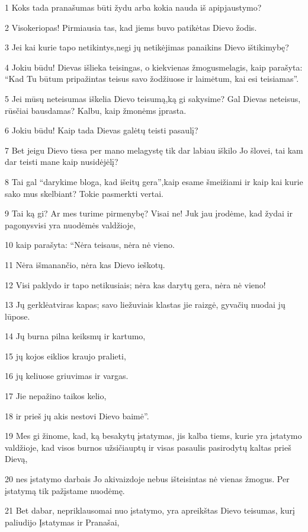 \par 1 Koks tada pranašumas būti žydu arba kokia nauda iš apipjaustymo? 
\par 2 Visokeriopas! Pirmiausia tas, kad jiems buvo patikėtas Dievo žodis. 
\par 3 Jei kai kurie tapo netikintys,­negi jų netikėjimas panaikins Dievo ištikimybę? 
\par 4 Jokiu būdu! Dievas išlieka teisingas, o kiekvienas žmogus­melagis, kaip parašyta: “Kad Tu būtum pripažintas teisus savo žodžiuose ir laimėtum, kai esi teisiamas”. 
\par 5 Jei mūsų neteisumas iškelia Dievo teisumą,­ką gi sakysime? Gal Dievas neteisus, rūsčiai bausdamas? Kalbu, kaip žmonėms įprasta. 
\par 6 Jokiu būdu! Kaip tada Dievas galėtų teisti pasaulį? 
\par 7 Bet jeigu Dievo tiesa per mano melagystę tik dar labiau iškilo Jo šlovei, tai kam dar teisti mane kaip nusidėjėlį? 
\par 8 Tai gal “darykime bloga, kad išeitų gera”,­kaip esame šmeižiami ir kaip kai kurie sako mus skelbiant? Tokie pasmerkti vertai. 
\par 9 Tai ką gi? Ar mes turime pirmenybę? Visai ne! Juk jau įrodėme, kad žydai ir pagonys­visi yra nuodėmės valdžioje, 
\par 10 kaip parašyta: “Nėra teisaus, nėra nė vieno. 
\par 11 Nėra išmanančio, nėra kas Dievo ieškotų. 
\par 12 Visi paklydo ir tapo netikusiais; nėra kas darytų gera, nėra nė vieno! 
\par 13 Jų gerklė­atviras kapas; savo liežuviais klastas jie raizgė, gyvačių nuodai jų lūpose. 
\par 14 Jų burna pilna keiksmų ir kartumo, 
\par 15 jų kojos eiklios kraujo pralieti, 
\par 16 jų keliuose griuvimas ir vargas. 
\par 17 Jie nepažino taikos kelio, 
\par 18 ir prieš jų akis nestovi Dievo baimė”. 
\par 19 Mes gi žinome, kad, ką besakytų įstatymas, jis kalba tiems, kurie yra įstatymo valdžioje, kad visos burnos užsičiauptų ir visas pasaulis pasirodytų kaltas prieš Dievą, 
\par 20 nes įstatymo darbais Jo akivaizdoje nebus išteisintas nė vienas žmogus. Per įstatymą tik pažįstame nuodėmę. 
\par 21 Bet dabar, nepriklausomai nuo įstatymo, yra apreikštas Dievo teisumas, kurį paliudijo Įstatymas ir Pranašai,­ 
